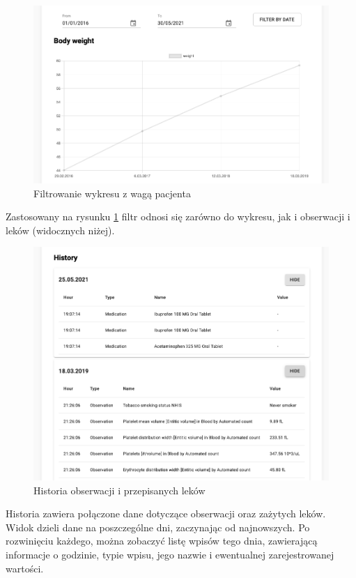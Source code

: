 \documentclass[polish,polish,a4paper]{article}
\begin{document}
	\begin{figure}[!h]
		\centering
		\includegraphics[width=.8\linewidth]{img/patient2.png}
		\caption{Filtrowanie wykresu z wagą pacjenta}
		\label{patient2}
	\end{figure}
	Zastosowany na rysunku \ref{patient2} filtr odnosi się zarówno do wykresu,
	jak i obserwacji i leków (widocznych niżej).
	
	\begin{figure}[!h]
		\centering
		\includegraphics[width=.8\linewidth]{img/patient3.png}
		\caption{Historia obserwacji i przepisanych leków}
	\end{figure}
	
	Historia zawiera połączone dane dotyczące obserwacji oraz zażytych leków.
	Widok dzieli dane na poszczególne dni, zaczynając od najnowszych.
	Po rozwinięciu każdego, można zobaczyć listę wpisów tego dnia,
	zawierającą informacje o godzinie, typie wpisu, jego nazwie i ewentualnej zarejestrowanej wartości.
	
	\newpage
	
\end{document}
